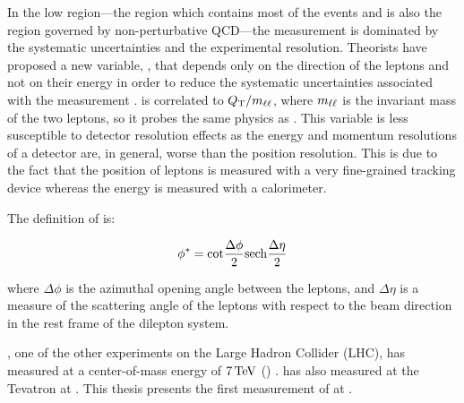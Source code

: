 In the low \bosonpt region---the region which contains most of the \Z events
and is also the region governed by non-perturbative QCD---the measurement is
dominated by the systematic uncertainties and the experimental resolution.
Theorists have proposed a new variable, \phistar, that depends only on the
direction of the leptons and not on their energy in order to reduce the
systematic uncertainties associated with the measurement \cite{banfi_2011}.
\phistar is correlated to $Q_{\mathrm{T}} / m_{\ell\ell}$, where $m_{\ell\ell}$ is the invariant mass
of the two leptons, so it probes the same physics as \bosonpt. This variable is
less susceptible to detector resolution effects as the energy and momentum
resolutions of a detector are, in general, worse than the position resolution.
This is due to the fact that the position of leptons is measured with a very
fine-grained tracking device whereas the energy is measured with a calorimeter.

The definition of \phistar is:

\begin{equation}\label{eq:phistar}
    \phi^{*} = {\mathrm{cot}} \frac{\Delta \phi}{2} {\mathrm{sech}} \frac{\Delta \eta}{2}
\end{equation}

where $\Delta \phi$ is the azimuthal opening angle between the leptons,
and $\Delta \eta$ is a measure of the scattering angle of the leptons with
respect to the beam direction in the rest frame of the dilepton system.

\ATLAS, one of the other experiments on the Large Hadron Collider (LHC), has
measured \phistar at a center-of-mass energy of $7 \,\text{Te\hspace{-.08em}V}$ (\rootsseven)
\cite{atlas_phistar}. \DZERO has also measured \phistar at the Tevatron at
\rootsTevatron \cite{d0_phistar_2011}\cite{d0_phistar_2014}. This thesis
presents the first measurement of \phistar at \rootseight.
